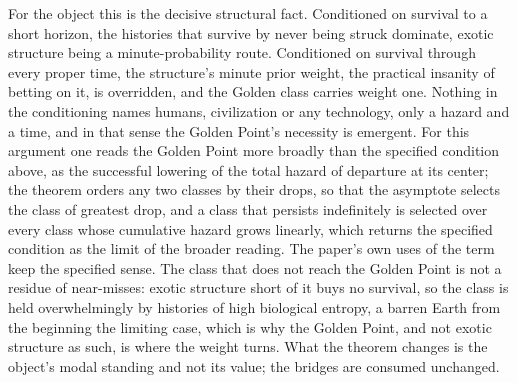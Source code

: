 For the object this is the decisive structural fact. Conditioned on survival
to a short horizon, the histories that survive by never being struck
dominate, exotic structure being a minute-probability route. Conditioned on
survival through every proper time, the structure's minute prior weight, the
practical insanity of betting on it, is overridden, and the Golden class
carries weight one. Nothing in the conditioning names humans, civilization
or any technology, only a hazard and a time, and in that sense the Golden
Point's necessity is emergent. For this argument one reads the
Golden Point more broadly than the specified condition above, as the
successful lowering of the total hazard of departure at its center; the
theorem orders any two classes by their drops, so that the asymptote
selects the class of greatest drop, and a class that persists indefinitely
is selected over every class whose cumulative hazard grows linearly, which
returns the specified condition as the limit of the broader reading. The
paper's own uses of the term keep the specified sense. The class that does
not reach the Golden Point is not a residue of near-misses: exotic structure
short of it buys no survival, so the class is held overwhelmingly by
histories of high biological entropy, a barren Earth from the beginning the
limiting case, which is why the Golden Point, and not exotic structure as
such, is where the weight turns. What the theorem changes is the object's
modal standing and not its value; the bridges are consumed unchanged.

